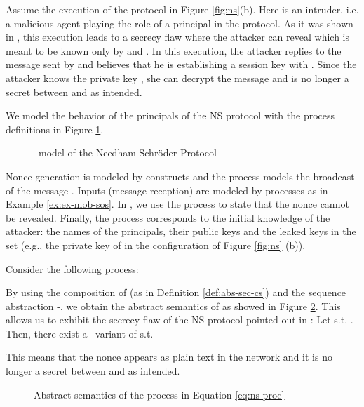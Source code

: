 \documentclass{tlp}
\begin{document}
Assume the execution of the protocol in Figure \ref{fig:ns}(b). Here  is an intruder, i.e. a malicious agent playing the role of a principal in the protocol. As it was shown in \cite{lowe95attack}, this execution leads to a secrecy flaw where the attacker  can reveal   which is meant to be known only by  and . 
In this execution, the attacker replies to  the message sent by  and  believes that he is establishing a session key with . Since the attacker knows the private key , she can decrypt the message  and  is no longer a secret between  and  as intended. 


We model the behavior of the principals of the NS protocol with the process definitions in Figure \ref{ns:utcc:procs}. 
\begin{figure}
\resizebox{\textwidth}{!}{

}
\caption{\utcc\ model of the Needham-Schr\"oder Protocol \label{ns:utcc:procs}}
\end{figure}
Nonce generation is modeled by  constructs and the process  models the broadcast of the  message . Inputs (message reception) are modeled by 
  processes as in Example \ref{ex:ex-mob-sos}. In , we use the process  to state that the nonce   cannot be revealed. Finally, the process  corresponds to the initial knowledge of the attacker:   the names of the principals, their public keys and the 
 leaked keys in the set  (e.g., the private key of  in the configuration of Figure \ref{fig:ns} (b)).









Consider the following process:



By using the composition of   (as in Definition \ref{def:abs-sec-cs}) and the sequence abstraction -, we  obtain the abstract semantics of  as showed in  Figure \ref{fig:semantics-ns}. This allows us  to exhibit the  secrecy flaw of the NS protocol pointed out in \cite{lowe95attack}: 
Let  s.t. . Then, there exist a --variant  of  s.t.
 
This means that the nonce  appears as plain text in the network and it is no longer a secret between  and  as intended. 



\begin{figure}
\resizebox{\textwidth}{!}{

}
\caption{Abstract semantics of the process  in Equation \ref{eq:ns-proc}\label{fig:semantics-ns}}
\end{figure}
\end{document}

